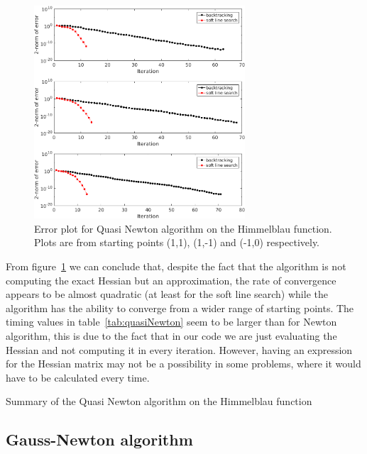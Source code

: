 \begin{figure}[htb]
\centering
\includegraphics[width=0.7\textwidth]{../img/quasiNewtonError}
\caption{Error plot for Quasi Newton algorithm on the Himmelblau function. Plots are from starting points (1,1), (1,-1) and (-1,0) respectively.}
\label{fig:rateConvQuasiNewton}
\end{figure}

From figure~\ref{fig:rateConvQuasiNewton} we can conclude that, despite the fact that the algorithm is not computing the exact Hessian but an approximation, the rate of convergence appears to be almost quadratic (at least for the soft line search) while the algorithm has the ability to converge from a wider range of starting points. The timing values in table~\ref{tab:quasiNewton} seem to be larger than for Newton algorithm, this is due to the fact that in our code we are just evaluating the Hessian and not computing it in every iteration. However, having an expression for the Hessian matrix may not be a possibility in some problems, where it would have to be calculated every time.

\begin{table}[H]
\centering

\caption{Summary of the Quasi Newton algorithm on the Himmelblau function}
\label{tab:quasiNewton}
\end{table}

\subsection{Gauss-Newton algorithm}

